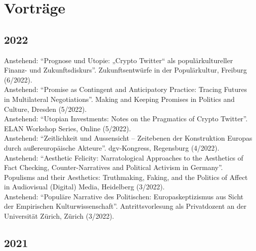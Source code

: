 \section*{Vorträge}
\subsection*{2022}
Anstehend: \enquote{Prognose und Utopie: „Crypto Twitter“ als populärkultureller Finanz- und Zukunftsdiskurs}. Zukunftsentwürfe in der Populärkultur, Freiburg (6/2022).\\[.25cm]Anstehend: \enquote{Promise as Contingent and Anticipatory Practice: Tracing Futures in Multilateral Negotiations}. Making and Keeping Promises in Politics and Culture, Dresden (5/2022).\\[.25cm]Anstehend: \enquote{Utopian Investments: Notes on the Pragmatics of Crypto Twitter}. ELAN Workshop Series, Online (5/2022).\\[.25cm]Anstehend: \enquote{Zeitlichkeit und Aussensicht – Zeitebenen der Konstruktion Europas durch außereuropäische Akteure}. dgv-Kongress, Regensburg (4/2022).\\[.25cm]Anstehend: \enquote{Aesthetic Felicity: Narratological Approaches to the Aesthetics of Fact Checking, Counter-Narratives and Political Activism in Germany}. Populisms and their Aesthetics: Truthmaking, Faking, and the Politics of Affect in Audiovisual (Digital) Media, Heidelberg (3/2022).\\[.25cm]Anstehend: \enquote{Populäre Narrative des Politischen: Europaskeptizismus aus Sicht der Empirischen Kulturwissenschaft}. Antrittsvorlesung als Privatdozent an der Universität Zürich, Zürich (3/2022).\subsection*{2021}
